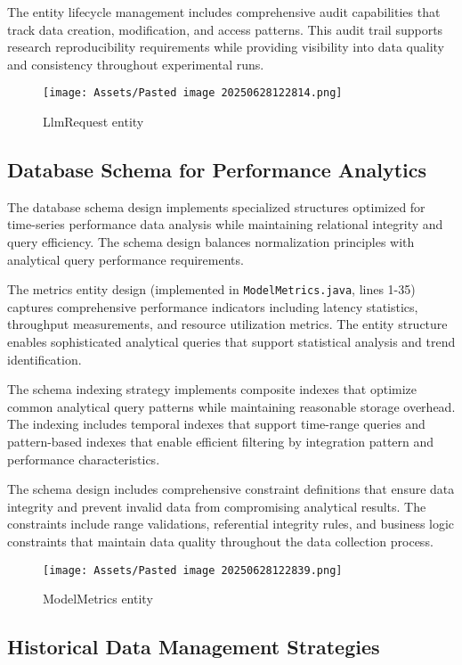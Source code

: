 The entity lifecycle management includes comprehensive audit capabilities that track data creation, modification, and access patterns. This audit trail supports research reproducibility requirements while providing visibility into data quality and consistency throughout experimental runs.

\begin{figure}[H]
    \centering
    \texttt{[image: Assets/Pasted image 20250628122814.png]}
    \caption{LlmRequest entity}
\end{figure}

\subsection{Database Schema for Performance Analytics}

The database schema design implements specialized structures optimized for time-series performance data analysis while maintaining relational integrity and query efficiency. The schema design balances normalization principles with analytical query performance requirements.

The metrics entity design (implemented in \texttt{ModelMetrics.java}, lines 1-35) captures comprehensive performance indicators including latency statistics, throughput measurements, and resource utilization metrics. The entity structure enables sophisticated analytical queries that support statistical analysis and trend identification.


The schema indexing strategy implements composite indexes that optimize common analytical query patterns while maintaining reasonable storage overhead. The indexing includes temporal indexes that support time-range queries and pattern-based indexes that enable efficient filtering by integration pattern and performance characteristics.

The schema design includes comprehensive constraint definitions that ensure data integrity and prevent invalid data from compromising analytical results. The constraints include range validations, referential integrity rules, and business logic constraints that maintain data quality throughout the data collection process.

\begin{figure}[H]
    \centering
    \texttt{[image: Assets/Pasted image 20250628122839.png]}
    \caption{ModelMetrics entity}
\end{figure}

\subsection{Historical Data Management Strategies}

